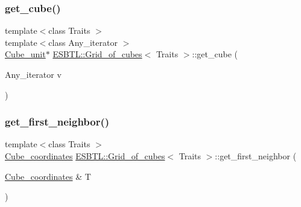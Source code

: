 \mbox{\label{structESBTL_1_1Grid__of__cubes_a0af6b76850ef42d6b6ac984a778ad488}} 
\subsubsection{\texorpdfstring{get\+\_\+cube()}{get\_cube()}\hspace{0.1cm}{\footnotesize\ttfamily [2/2]}}
{\footnotesize\ttfamily template$<$class Traits $>$ \\
template$<$class Any\+\_\+iterator $>$ \\
\hyperlink{structESBTL_1_1Grid__of__cubes_1_1Cube__unit}{Cube\+\_\+unit}$\ast$ \hyperlink{structESBTL_1_1Grid__of__cubes}{E\+S\+B\+T\+L\+::\+Grid\+\_\+of\+\_\+cubes}$<$ Traits $>$\+::get\+\_\+cube (\begin{DoxyParamCaption}\item[{Any\+\_\+iterator}]{v }\end{DoxyParamCaption})\hspace{0.3cm}{\ttfamily [inline]}}

\mbox{\label{structESBTL_1_1Grid__of__cubes_aee9c04e5770082fe01a7badda0833bca}} 
\subsubsection{\texorpdfstring{get\+\_\+first\+\_\+neighbor()}{get\_first\_neighbor()}}
{\footnotesize\ttfamily template$<$class Traits $>$ \\
\hyperlink{structESBTL_1_1Grid__of__cubes_ad55c84346bab961e08d95e494551d07d}{Cube\+\_\+coordinates} \hyperlink{structESBTL_1_1Grid__of__cubes}{E\+S\+B\+T\+L\+::\+Grid\+\_\+of\+\_\+cubes}$<$ Traits $>$\+::get\+\_\+first\+\_\+neighbor (\begin{DoxyParamCaption}\item[{\hyperlink{structESBTL_1_1Grid__of__cubes_ad55c84346bab961e08d95e494551d07d}{Cube\+\_\+coordinates} \&}]{T }\end{DoxyParamCaption})\hspace{0.3cm}{\ttfamily [inline]}}

